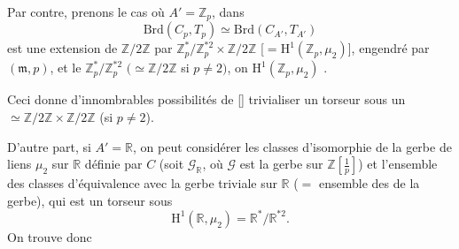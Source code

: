 \documentclass[11pt,a4paper]{article}
\begin{document}
Par contre, prenons le cas où $A' = \mathbb{Z}_{p}$, dans
\[
  \mathrm{Brd}(C_{p}, T_{p}) \simeq \mathrm{Brd}(C_{A'}, T_{A'})
\]
est une extension de $\mathbb{Z}/2\mathbb{Z}$ par
$\mathbb{Z}_{p}^{*}/\mathbb{Z}_{p}^{*2} \times \mathbb{Z}/2\mathbb{Z}$
[$= \mathrm{H}^{1}(\mathbb{Z}_{p}, \mu_{2})$], engendré par $(\mathfrak{m}, p)$,
et le \ill{}
$\mathbb{Z}_{p}^{*}/\mathbb{Z}_{p}^{*2}$ $(\simeq \mathbb{Z}/2\mathbb{Z}$
si $p \neq 2)$, on  \ill{}
$\mathrm{H}^{1}(\mathbb{Z}_{p}, \mu_{2})$ \struck{\ill{}}.

Ceci donne d'innombrables possibilités de
\struck{\ill{}} [\ill{}] trivialiser un torseur sous un
 $\simeq \mathbb{Z}/2\mathbb{Z} \times
\mathbb{Z}/2\mathbb{Z}$ (si $p \neq 2$).

D'autre part, si $A' = \mathbb{R}$, on peut considérer les classes
d'isomorphie de la gerbe de liens $\mu_{2}$ sur $\mathbb{R}$ définie par $C$
(soit $\mathcal{G}_{\mathbb{R}}$, où $\mathcal{G}$ est la gerbe sur
$\mathbb{Z}[\tfrac{1}{p}]$) et l'ensemble des classes d'équivalence avec la
gerbe triviale sur $\mathbb{R}$ ($=$ ensemble des 
de la gerbe), qui est un torseur sous
\[
  \mathrm{H}^{1}(\mathbb{R}, \mu_{2}) = \mathbb{R}^{*}/\mathbb{R}^{*2}.
\]
On trouve donc
\end{document}
